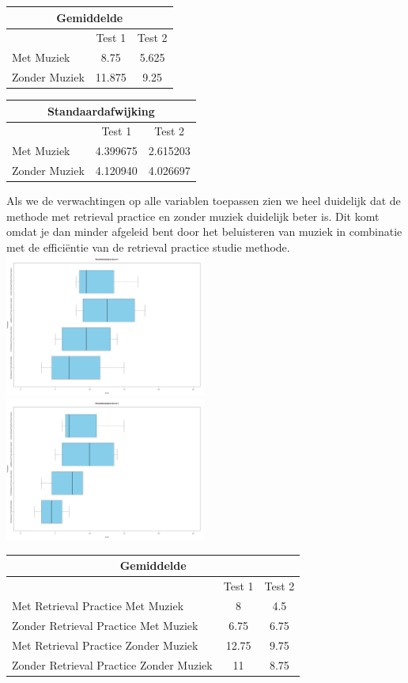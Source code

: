 \documentclass{hogent-article}
\begin{document}
	\begin{tabular}{ |p{10em}|c|c| }
	\hline
		\multicolumn{3}{|c|}{Gemiddelde} \\
	\hline
		& Test 1 & Test 2 \\
	\hline
		Met Muziek & 8.75  & 5.625 \\
		Zonder Muziek & 11.875 & 9.25 \\
	\hline
	\end{tabular}
	
	\begin{tabular}{ |p{10em}|c|c| }
	\hline
		\multicolumn{3}{|c|}{Standaardafwijking} \\
	\hline
		& Test 1 & Test 2 \\
	\hline
		Met Muziek & 4.399675  & 2.615203 \\
		Zonder Muziek & 4.120940 & 4.026697 \\
	\hline
	\end{tabular}
	
	Als we de verwachtingen op alle variablen toepassen zien we heel duidelijk dat de methode met retrieval practice en zonder muziek duidelijk beter is. Dit komt omdat je dan minder afgeleid bent door het beluisteren van muziek in combinatie met de efficiëntie van de retrieval practice studie methode. 
	\includegraphics[width=250px]{Verwacht_MuziekRT_Score1}
	\includegraphics[width=250px]{Verwacht_MuziekRT_Score2}
	\begin{tabular}{ |p{10em}|c|c| }
	\hline
		\multicolumn{3}{|c|}{Gemiddelde} \\
	\hline
		& Test 1 & Test 2 \\
	\hline
		Met Retrieval Practice Met Muziek  & 8 & 4.5 \\
	\hline
		Zonder Retrieval Practice Met Muziek & 6.75 & 6.75 \\
	\hline
		Met Retrieval Practice Zonder Muziek & 12.75  & 9.75 \\
	\hline
		Zonder Retrieval Practice Zonder Muziek & 11 & 8.75 \\
	\hline
	\end{tabular}
	
\end{document}

